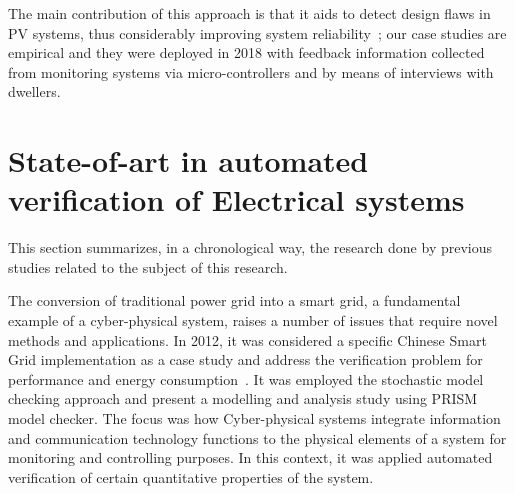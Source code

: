 \documentclass[runningheads]{llncs}
\begin{document}
The main contribution of this approach is that it aids to detect design flaws in PV systems, thus considerably improving system reliability~\cite{Akram2018}; our case studies are empirical and they were deployed in 2018 with feedback information collected from monitoring systems via micro-controllers and by means of interviews with dwellers. 

\section{State-of-art in automated verification of Electrical systems}

This section summarizes, in a chronological way, the research done by previous studies related to the subject of this research.

The conversion of traditional power grid into a smart grid, a fundamental example of a cyber-physical system, raises a number of issues that require novel methods and applications. In 2012, it was considered a specific Chinese Smart Grid implementation as a case study and address the verification problem for performance and energy consumption~\cite{Yukseletall2012}. It was employed the stochastic model checking approach and present a modelling and analysis study using PRISM model checker. The focus was how Cyber-physical systems integrate information and communication technology functions to the physical elements of a system for monitoring and controlling purposes.  In this context, it was applied automated verification of certain quantitative properties of the system. %
\end{document}
